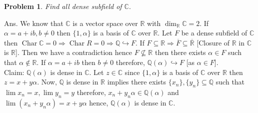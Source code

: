 \documentclass[11pt]{amsart}
\newtheorem{problem}[theorem]{Problem}
\newcommand{\QQ}{\mathbb Q}
\newcommand{\CC}{\mathbb C}
\newcommand{\RR}{\mathbb R}
\begin{document}
\begin{problem}
Find all dense subfield of ${\CC}.$
\end{problem}

Ans. We know that ${\CC}$ is a vector space over ${\RR}$ with $\dim_{{\RR}}{\CC}=2.$ If $\alpha=a+ib,b\neq 0$ then $\{1,\alpha\}$ is a basis of ${\CC}$ over ${\RR}.$ Let $F$ be a dense subfield of ${\CC}$ then $\operatorname{Char}{\CC}=0\Rightarrow \operatorname{Char}R=0 \Rightarrow {\QQ}\hookrightarrow F.$ If $F\subseteq {\RR} \Rightarrow \overline{F}\subseteq \overline{{\RR}}$ [Closure of ${\RR}$ in ${\CC}$ is ${\RR}$]. Then we have a contradiction hence $F\nsubseteq {\RR}$ then there exists $\alpha\in F$ such that $\alpha \notin {\RR}.$ If $\alpha=a+ib$ then $b\neq 0$ therefore, ${\QQ}(\alpha)\hookrightarrow F$ [as $\alpha \in F$].\\
Claim: ${\QQ}(\alpha)$ is dense in ${\CC}.$ Let $z\in {\CC}$ since $\{1,\alpha\}$ is a basis of ${\CC}$ over ${\RR}$ then $z=x+y\alpha.$ Now, ${\QQ}$ is dense in ${\RR}$ implies there exists $\{x_n\},\{y_n\}\subseteq {\QQ}$ such that $\lim x_n=x,\lim y_n=y$ therefore, $x_n+y_n\alpha\in {\QQ}(\alpha)$ and $\lim (x_n+y_n\alpha)=x+y\alpha$ hence, ${\QQ}(\alpha)$ is dense in ${\CC}.$
\end{document}
